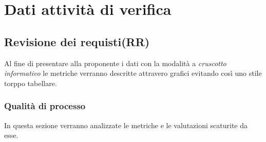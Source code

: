 \section{Dati attività di verifica}
\subsection{Revisione dei requisti(RR)}
Al fine di presentare alla proponente i dati con la modalità a \textit{cruscotto informativo} le metriche verranno descritte attravero grafici evitando così uno stile torppo tabellare.
\subsubsection{Qualità di processo}
In questa sezione verranno analizzate le metriche e le valutazioni scaturite da esse.
\clearpage
